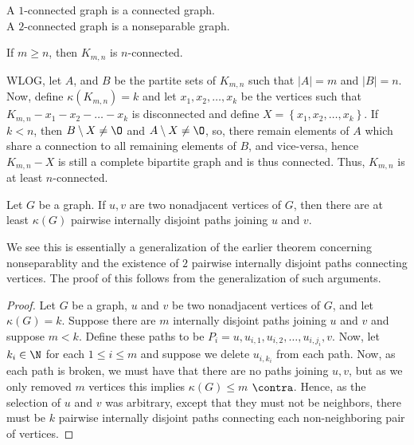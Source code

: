 \begin{example}
	A $1$-connected graph is a connected graph.\\
	A $2$-connected graph is a nonseparable graph.\\
\end{example}
\begin{problem}
	If $m\ge n$, then $K_{m, n}$ is $n$-connected.
\end{problem}
\begin{solution}
	WLOG, let $A$, and $B$ be the partite sets of $K_{m,n}$ such that $\left| A \right| = m$ and $\left| B \right| = n$. Now, define $\kappa \left( K_{m,n} \right)= k$ and let $x_1, x_2, \ldots, x_{k}$ be the vertices such that $K_{m,n} - x_1 - x_2 - \ldots - x_{k}$ is disconnected and define $X = \left\{ x_1, x_2, \ldots, x_{k} \right\} $. If $k < n$, then $B \setminus X \neq \O  $ and $A \setminus X \neq \O$, so, there remain elements of $A$ which share a connection to all remaining elements of $B$, and vice-versa, hence $K_{m,n}- X$ is still a complete bipartite graph and is thus connected. Thus, $K_{m, n}$ is at least $n$-connected.
\end{solution}
\begin{theorem}
	Let $G$ be a graph. If $u, v$ are two nonadjacent vertices of $G$, then there are at least $\kappa \left( G \right) $  pairwise internally disjoint paths joining $u$ and $v$.
\end{theorem}
We see this is essentially a generalization of the earlier theorem concerning nonseparablity and the existence of  $2$ pairwise internally disjoint paths connecting vertices. The proof of this follows from the generalization of such arguments.
\begin{proof}
	Let $G$ be a graph, $u$ and $v$ be two nonadjacent vertices of $G$, and let $\kappa \left( G \right) = k$. Suppose there are $m$ internally disjoint paths joining $u$ and $v$ and suppose $m < k$. Define these paths to be $P_{i} = u, u_{i, 1}, u _{i, 2}, \ldots, u_{i, j_{i}}, v$. Now, let $k_{i} \in \N$ for each $1 \le i \le m$ and suppose we delete  $u_{i, k_{i}}$ from each path. Now, as each path is broken, we must have that there are no paths joining $u, v$, but as we only removed $m$ vertices this implies $\kappa \left( G \right) \le m$ $\contra$. Hence, as the selection of $u$ and $v$ was arbitrary, except that they must not be neighbors, there must be $k$ pairwise internally disjoint paths connecting each non-neighboring pair of vertices.
\end{proof}
